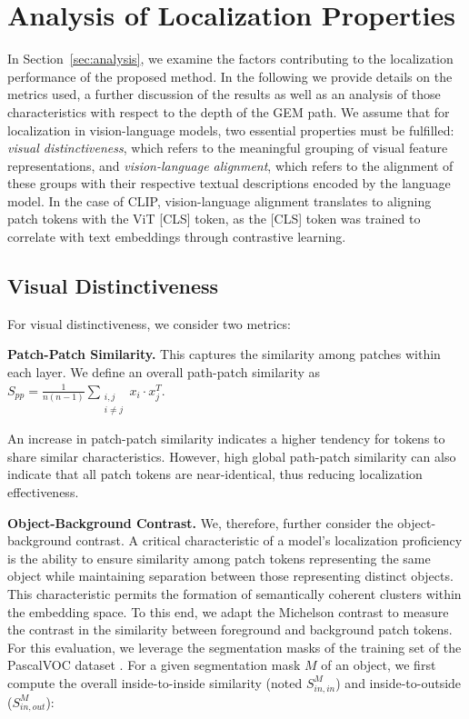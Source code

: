 \documentclass[10pt,twocolumn,letterpaper]{article}
\begin{document}
\section{Analysis of Localization Properties}\label{appendix:loc_prop_analysis}

In Section~\ref{sec:analysis}, we examine the factors contributing to the localization performance of the proposed method. In the following we provide details on the metrics used, a further discussion of the results as well as an analysis of those characteristics with respect to the depth of the GEM path. 
We assume that for localization in vision-language models, two essential properties must be fulfilled: \textit{visual distinctiveness}, which refers to the meaningful grouping of visual feature representations, and \textit{vision-language alignment}, which refers to the alignment of these groups with their respective textual descriptions encoded by the language model. In the case of CLIP, vision-language alignment translates to aligning patch tokens with the ViT [CLS] token, as the [CLS] token was trained to correlate with text embeddings through contrastive learning.

\subsection{Visual Distinctiveness} 
For visual distinctiveness, we consider two metrics:

\noindent \textbf{Patch-Patch Similarity.}
This captures the similarity among patches within each layer.  
We define an overall path-patch similarity as $S_{pp} = \frac{1}{n(n-1)} \sum\limits_{\substack{i, j \\ i \neq j}} x_i \cdot x_j^T$.

An increase in patch-patch similarity indicates a higher tendency for tokens to share similar characteristics.
However, high global path-patch similarity can also indicate that all patch tokens are near-identical, thus reducing localization effectiveness.






\noindent \textbf{Object-Background Contrast.}
We, therefore, further consider the object-background contrast. 
A critical characteristic of a model's localization proficiency is the ability to ensure similarity among patch tokens representing the same object while maintaining separation between those representing distinct objects. 
This characteristic permits the formation of semantically coherent clusters within the embedding space.
To this end, we adapt the Michelson contrast to measure the contrast in the similarity between foreground and background patch tokens. For this evaluation, we leverage the segmentation masks of the training set of the PascalVOC dataset \citep{everingham2010pascal}.
For a given segmentation mask $M$ of an object, we first compute the overall inside-to-inside similarity (noted $S^M_{in, in}$) and inside-to-outside ($S^M_{in, out}$): 
\end{document}
